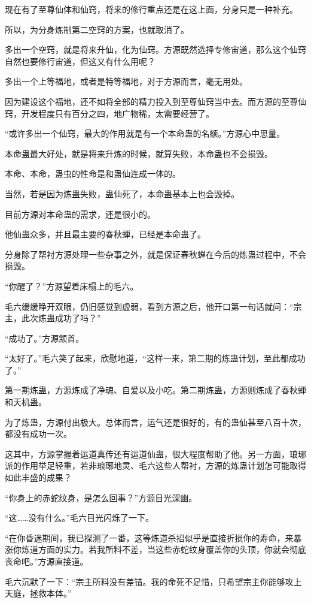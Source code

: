 \begin{this_body}
现在有了至尊仙体和仙窍，将来的修行重点还是在这上面，分身只是一种补充。

所以，为分身炼制第二空窍的方案，也就取消了。

多出一个空窍，就是将来升仙，化为仙窍。方源既然选择专修宙道，那么这个仙窍自然也要修行宙道，但这又有什么用呢？

多出一个上等福地，或者是特等福地，对于方源而言，毫无用处。

因为建设这个福地，还不如将全部的精力投入到至尊仙窍当中去。而方源的至尊仙窍，开发程度只有百分之四，地广物稀，太需要经营了。

“或许多出一个仙窍，最大的作用就是有一个本命蛊的名额。”方源心中思量。

本命蛊最大好处，就是将来升炼的时候，就算失败，本命蛊也不会损毁。

本命、本命，蛊虫的性命是和蛊仙连成一体的。

当然，若是因为炼蛊失败，蛊仙死了，本命蛊基本上也会毁掉。

目前方源对本命蛊的需求，还是很小的。

他仙蛊众多，并且最主要的春秋蝉，已经是本命蛊了。

分身除了帮衬方源处理一些杂事之外，就是保证春秋蝉在今后的炼蛊过程中，不会损毁。

“你醒了？”方源望着床榻上的毛六。

毛六缓缓睁开双眼，仍旧感觉到虚弱，看到方源之后，他开口第一句话就问：“宗主，此次炼蛊成功了吗？”

“成功了。”方源颔首。

“太好了。”毛六笑了起来，欣慰地道，“这样一来，第二期的炼蛊计划，至此都成功了。”

第一期炼蛊，方源炼成了净魂、自爱以及小吃。第二期炼蛊，方源则炼成了春秋蝉和天机蛊。

为了炼蛊，方源付出极大。总体而言，运气还是很好的，有的蛊仙甚至八百十次，都没有成功一次。

这其中，方源掌握着运道真传还有运道仙蛊，很大程度帮助了他。另一方面，琅琊派的作用举足轻重，若非琅琊地灵、毛六这些人帮衬，方源的炼蛊计划怎可能取得如此丰盛的成果？

“你身上的赤蛇纹身，是怎么回事？”方源目光深幽。

“这……没有什么。”毛六目光闪烁了一下。

“在你昏迷期间，我已探测了一番，这等炼道杀招似乎是直接折损你的寿命，来暴涨你炼道方面的实力。若我所料不差，当这些赤蛇纹身覆盖你的头顶，你就会彻底丧命吧。”方源直接道。

毛六沉默了一下：“宗主所料没有差错。我的命死不足惜，只希望宗主你能够攻上天庭，拯救本体。”


\end{this_body}

